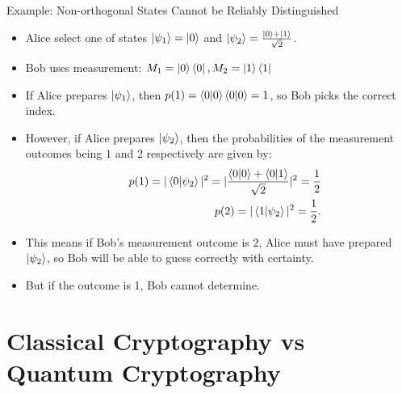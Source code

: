 \documentclass[handout, 10 pt]{beamer}
\begin{document}
\begin{frame}{Example: Non-orthogonal States Cannot be Reliably Distinguished}
\begin{itemize}
    \item Alice select one of states $\ket{\psi_1}=\ket{0}$ and  $\ket{\psi_2}=\frac{\ket{0}+\ket{1}}{\sqrt{2}}$.
    \pause
    \item Bob uses measurement: $M_1=\ket{0}\bra{0}, M_2=\ket{1}\bra{1}$
    \pause
    \item If Alice prepares $\ket{\psi_1}$, then $p(1)=\braket{0 |0}\braket{0|0}=1$, so Bob picks the correct index.
    \pause
    \item However, if Alice prepares $\ket{\psi_2}$, then the probabilities of the measurement outcomes being $1$ and $2$ respectively are given by:
    \begin{eqnarray}
    & &p(1)=|\braket{0|\psi_2}|^2=|\frac{\braket{0|0}+\braket{0|1}}{\sqrt{2}}|^2=\frac{1}{2}\\
    & &p(2)=|\braket{1|\psi_2}|^2={\frac{1}{2}}.
    \end{eqnarray}
    \item This means if Bob's measurement outcome is $2$, Alice must have prepared $\ket{\psi_2}$, so Bob will be able to guess correctly with certainty.
    \pause
    \item But if the outcome is 1, Bob cannot determine.
\end{itemize}
\end{frame}

\section{Classical Cryptography vs Quantum Cryptography}
\end{document}
